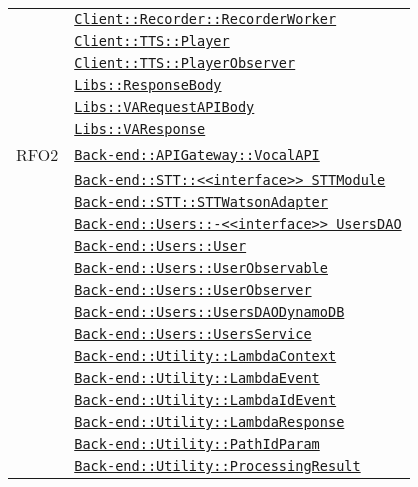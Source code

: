 \begin{longtable}{|>{\centering}m{3cm}|m{10cm}<{\centering}|}
& \hyperref[Client::Recorder::RecorderWorker]{\texttt{Client::Recorder::RecorderWorker}}\\
& \hyperref[Client::TTS::Player]{\texttt{Client::TTS::Player}}\\
& \hyperref[Client::TTS::PlayerObserver]{\texttt{Client::TTS::PlayerObserver}}\\
& \hyperref[Libs::ResponseBody]{\texttt{Libs::ResponseBody}}\\
& \hyperref[Libs::VARequestAPIBody]{\texttt{Libs::VARequestAPIBody}}\\
& \hyperref[Libs::VAResponse]{\texttt{Libs::VAResponse}}\\ \hline

RFO2 & \hyperref[Back-end::APIGateway::VocalAPI]{\texttt{Back-end::APIGateway::VocalAPI}}\\
& \hyperref[Back-end::STT::<<interface>> STTModule]{\texttt{Back-end::STT::<<interface>> STTModule}}\\
& \hyperref[Back-end::STT::STTWatsonAdapter]{\texttt{Back-end::STT::STTWatsonAdapter}}\\
& \hyperref[Back-end::Users::<<interface>> UsersDAO]{\texttt{Back-end::Users::-\linebreak <<interface>> UsersDAO}}\\
& \hyperref[Back-end::Users::User]{\texttt{Back-end::Users::User}}\\
& \hyperref[Back-end::Users::UserObservable]{\texttt{Back-end::Users::UserObservable}}\\
& \hyperref[Back-end::Users::UserObserver]{\texttt{Back-end::Users::UserObserver}}\\
& \hyperref[Back-end::Users::UsersDAODynamoDB]{\texttt{Back-end::Users::UsersDAODynamoDB}}\\
& \hyperref[Back-end::Users::UsersService]{\texttt{Back-end::Users::UsersService}}\\
& \hyperref[Back-end::Utility::LambdaContext]{\texttt{Back-end::Utility::LambdaContext}}\\
& \hyperref[Back-end::Utility::LambdaEvent]{\texttt{Back-end::Utility::LambdaEvent}}\\
& \hyperref[Back-end::Utility::LambdaIdEvent]{\texttt{Back-end::Utility::LambdaIdEvent}}\\
& \hyperref[Back-end::Utility::LambdaResponse]{\texttt{Back-end::Utility::LambdaResponse}}\\
& \hyperref[Back-end::Utility::PathIdParam]{\texttt{Back-end::Utility::PathIdParam}}\\
& \hyperref[Back-end::Utility::ProcessingResult]{\texttt{Back-end::Utility::ProcessingResult}}\\

\end{longtable}

